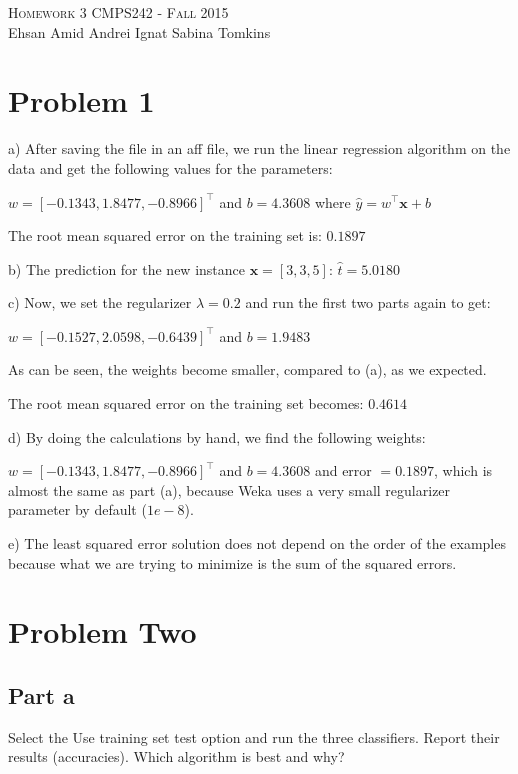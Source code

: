 \documentclass{article}
\begin{document}
\begin{center}
\Huge{\textsc{Homework 3}} 
\Large\textsc{CMPS242 - Fall 2015}\\

\large{Ehsan Amid \hfill Andrei Ignat  \hfill Sabina Tomkins} 
\end{center}

\section{Problem 1}

a) After saving the file in an aff file, we run the linear regression algorithm on the data and get the following values for the parameters:

$w = [-0.1343, 1.8477,  -0.8966]^\top$ and $b = 4.3608$ where $\hat{y} = w^\top \mathbf{x} + b$

The root mean squared error on the training set is: $0.1897$\newline

b) The prediction for the new instance $\mathbf{x} = [3, 3, 5]$: $\hat{t} = 5.0180$\newline

c) Now, we set the regularizer $\lambda = 0.2$ and run the first two parts again to get:

$w = [-0.1527, 2.0598, -0.6439]^\top$ and $b = 1.9483$

As can be seen, the weights become smaller, compared to (a), as we expected.

The root mean squared error on the training set becomes: $0.4614$\newline 

d) By doing the calculations by hand, we find the following weights:

$w = [ -0.1343, 1.8477, -0.8966]^\top$ and $b = 4.3608$ and error $= 0.1897$, which is almost the same as part (a), because Weka uses a very small regularizer parameter by default ($1e-8$).\newline

e) The least squared error solution does not depend on the order of the examples because what we are trying to minimize is the sum of the squared errors.\newline

\section{Problem Two}
\subsection{Part a}
Select the Use training set test option and run the three classifiers. Report their results (accuracies). Which algorithm is best and why?
\end{document}
